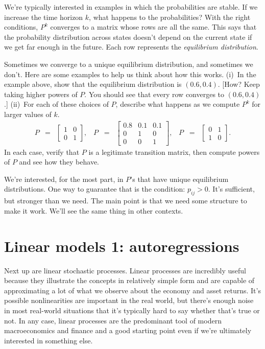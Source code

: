 \documentclass[11pt]{article}
\begin{document}
We're typically interested in examples in which the probabilities are stable.
If we increase the time horizon $k$, what happens to the probabilities?
With the right conditions,
$P^k$ converges to a matrix whose rows are all the same.
This says that the probability distribution across states doesn't depend
on the current state if we get far enough in the future.
Each row represents the {\it equilibrium distribution\/}.

Sometimes we converge to a unique equilibrium distribution,
and sometimes we don't.
Here are some examples to help us think about how this works.
(i)~In the example above, show that the equilibrium distribution is $ (0.6, 0.4)$.
[How?  Keep taking higher powers of $P$.
You should see that every row converges to $(0.6, 0.4)$.]
(ii)~For each of these choices of $P$, describe what happens as we compute
$P^k$ for larger values of $k$.
\begin{eqnarray*}
    P &=& \left[
            \begin{array}{cc}
            1 & 0 \\  0 & 1
            \end{array}
            \right], \;\;\;
    P \;\;=\;\; \left[
            \begin{array}{ccc}
            0.8 & 0.1 & 0.1 \\ 0 & 1 & 0 \\ 0 & 0 & 1
            \end{array}
            \right], \;\;\;
    P \;\;=\;\; \left[
            \begin{array}{cc}
            0 & 1 \\  1 & 0
            \end{array}
            \right] .
\end{eqnarray*}
In each case, verify that $P$ is a legitimate transition matrix,
then compute powers of $P$ and see how they behave.

We're interested, for the most part, in $P$'s that have
unique equilibrium distributions.
One way to guarantee that is the condition:  $p_{ij} > 0$.
It's sufficient, but stronger than we need.
The main point is that we need some structure to make it work.
We'll see the same thing in other contexts.


\section{Linear models 1:  autoregressions}
\label{sec:autoregressions}

Next up are linear stochastic processes.
Linear processes are incredibly useful because they illustrate the concepts
in relatively simple form and are capable of approximating
a lot of what we observe about the economy and asset returns.
It's possible nonlinearities are important in the real world,
but there's enough noise in most real-world situations
that it's typically hard to say whether that's true or not.
In any case, linear processes are the predominant tool
of modern macroeconomics and finance and a good starting point even
if we're ultimately interested in something else.
\end{document}
